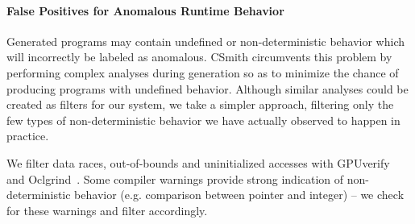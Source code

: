 


\paragraph{False Positives for Anomalous Runtime Behavior}\label{subsec:discussions}
Generated programs may contain undefined or non-deterministic behavior which will incorrectly be labeled as anomalous. CSmith circumvents this problem by performing  complex analyses during generation so as to minimize the chance of producing programs with undefined behavior. Although similar analyses could be created as filters for our system, we take a simpler approach, filtering only the few types of non-deterministic behavior we have actually observed to happen in practice.

We filter data races, out-of-bounds and uninitialized accesses with GPUverify~\cite{Betts2012} and Oclgrind~\cite{Price2015}. Some compiler warnings provide strong indication of non-deterministic behavior (e.g. comparison between pointer and integer) -- we check for these warnings and filter accordingly.


